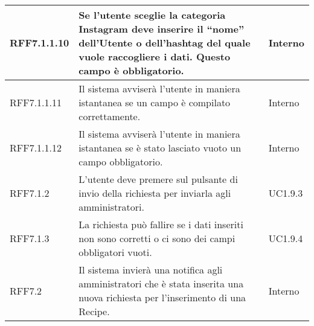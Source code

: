 \begin{center}
\begin{longtable}{| p{2.5cm} | p{8cm} | p{2cm} |}
		\hline
		RFF7.1.1.10 & Se l'utente sceglie la categoria Instagram deve inserire il ``nome'' dell'Utente o dell'hashtag del quale vuole raccogliere i dati. Questo campo è obbligatorio. & Interno \\
		\hline
		RFF7.1.1.11 & Il sistema avviserà l'utente in maniera istantanea se un campo è compilato correttamente. & Interno \\
		\hline
		RFF7.1.1.12 & Il sistema avviserà l'utente in maniera istantanea se è stato lasciato vuoto un campo obbligatorio. & Interno \\
		\hline
		RFF7.1.2 & L'utente deve premere sul pulsante di invio della richiesta per inviarla agli amministratori. & UC1.9.3  \\
		\hline
		RFF7.1.3 & La richiesta può fallire se i dati inseriti non sono corretti o ci sono dei campi obbligatori vuoti. & UC1.9.4  \\
		\hline
		RFF7.2  & Il sistema invierà una notifica agli amministratori che è stata inserita una nuova richiesta per l'inserimento di una Recipe. & Interno \\
		\hline



\end{longtable}
\end{center}
